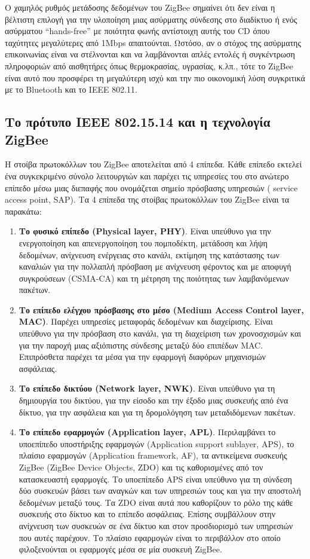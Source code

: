 \documentclass[12pt, a4paper, oneside]{report}
\begin{document}
Ο χαμηλός ρυθμός μετάδοσης δεδομένων του ZigBee σημαίνει ότι δεν είναι η βέλτιστη επιλογή για την υλοποίηση μιας ασύρματης σύνδεσης στο διαδίκτυο ή ενός ασύρματου ``hands-free'' με ποιότητα φωνής αντίστοιχη αυτής του CD όπου ταχύτητες μεγαλύτερες από 1Mbps απαιτούνται. Ωστόσο, αν ο στόχος της ασύρματης επικοινωνίας είναι να στέλνονται και να λαμβάνονται απλές εντολές ή συγκέντρωση πληροφοριών από αισθητήρες όπως θερμοκρασίας, υγρασίας, κ.λπ., τότε το ZigBee είναι αυτό που προσφέρει τη μεγαλύτερη ισχύ και την πιο οικονομική λύση συγκριτικά με το Bluetooth και το IEEE 802.11.

\subsection[IEEE 802.15.15 και Τεχνολογία ZigBee]{Το πρότυπο IEEE 802.15.14 και η τεχνολογία ZigBee}

Η στοίβα πρωτοκόλλων του ZigBee αποτελείται από 4 επίπεδα. Κάθε επίπεδο εκτελεί ένα συγκεκριμένο σύνολο λειτουργιών και παρέχει τις υπηρεσίες του στο ανώτερο επίπεδο μέσω μιας διεπαφής που ονομάζεται σημείο πρόσβασης υπηρεσιών ( service access point, SAP). Τα 4 επίπεδα της στοίβας πρωτοκόλλων του ZigBee είναι τα παρακάτω: 
\begin{enumerate}
\item \textbf{Το φυσικό επίπεδο (Physical layer, PHY)}. Είναι υπεύθυνο για την ενεργοποίηση και απενεργοποίηση του πομποδέκτη, μετάδοση και λήψη δεδομένων, ανίχνευση ενέργειας στο κανάλι, εκτίμηση της κατάστασης των καναλιών για την πολλαπλή πρόσβαση με ανίχνευση φέροντος και με αποφυγή συγκρούσεων (CSMA-CA) και τη μέτρηση της ποιότητας των λαμβανόμενων πακέτων.
\item \textbf{Το επίπεδο ελέγχου πρόσβασης στο μέσο (Medium Access Control layer, MAC)}. Παρέχει υπηρεσίες μεταφοράς δεδομένων και διαχείρισης. Είναι υπεύθυνο για την πρόσβαση στο κανάλι, για τη διαχείριση των χρονοσχισμών και για την παροχή μιας αξιόπιστης σύνδεσης μεταξύ δύο επιπέδων MAC. Επιπρόσθετα παρέχει τα μέσα για την εφαρμογή διαφόρων μηχανισμών ασφάλειας.
\item \textbf{Το επίπεδο δικτύου (Network layer, NWK)}. Είναι υπεύθυνο για τη δημιουργία του δικτύου, για την είσοδο και την έξοδο μιας συσκευής από ένα δίκτυο, για την ασφάλεια και για τη δρομολόγηση των μεταδιδόμενων πακέτων.
\item \textbf{Το επίπεδο εφαρμογών (Application layer, APL)}. Περιλαμβάνει το υποεπίπεδο υποστήριξης εφαρμογών (Application support sublayer, APS), το πλαίσιο εφαρμογών (Application framework, AF), τα αντικείμενα συσκευής ZigBee (ZigBee Device Objects, ZDO) και τις καθορισμένες από τον κατασκευαστή εφαρμογές. Το υποεπίπεδο APS είναι υπεύθυνο για τη σύνδεση δύο συσκευών βάσει των αναγκών και των υπηρεσιών τους και για την αποστολή δεδομένων μεταξύ τους. Τα ZDO είναι αυτά που καθορίζουν το ρόλο της κάθε συσκευής στο δίκτυο και το επίπεδο ασφάλειας. Επίσης συμβάλλουν στην ανίχνευση των συσκευών σε ένα δίκτυο και στον προσδιορισμό των υπηρεσιών που αυτές παρέχουν. Το πλαίσιο εφαρμογών είναι το περιβάλλον στο οποίο φιλοξενούνται οι εφαρμογές μέσα σε μία συσκευή ZigBee.
\end{enumerate}
\end{document}
